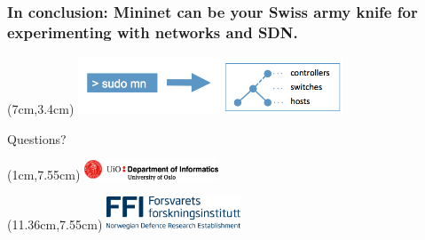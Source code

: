 \documentclass{beamer}
\begin{document}
\begin{frame}[plain]
  \frametitle{In conclusion: Mininet can be your Swiss army knife for
    experimenting with networks and SDN.}

  \begin{textblock*}{7.9cm} (7cm,3.4cm) %
    \includegraphics[width=7.9cm]{images/mininet.png}
    \captionsetup[figure]{justification=centering,font=footnotesize}
  \end{textblock*}

  \hspace{1cm}
  \large{\color{gray}Questions?}

  \begin{textblock*}{4cm} (1cm,7.55cm) %
    \includegraphics[width=4cm]{images/uio-ifi.png}
  \end{textblock*}

  \begin{textblock*}{4cm} (11.36cm,7.55cm) %
    \includegraphics[width=4cm]{images/ffi.png}
  \end{textblock*}

  \addtocounter{framenumber}{-1}
\end{frame}
\end{document}
